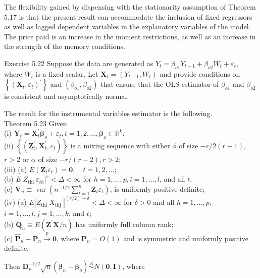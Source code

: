 \documentclass[10pt]{article}
\begin{document}
The flexibility gained by dispensing with the stationarity assumption of Theorem 5.17 is that the present result can accommodate the inclusion of fixed regressors as well as lagged dependent variables in the explanatory variables of the model. The price paid is an increase in the moment restrictions, as well as an increase in the strength of the memory conditions.

Exercise 5.22 Suppose the data are generated as $Y_{t}=\beta_{o 1} Y_{t-1}+\beta_{o 2} W_{t}+ \varepsilon_{t}$, where $W_{t}$ is a fixed scalar. Let $\mathbf{X}_{t}=\left(Y_{t-1}, W_{t}\right)$ and provide conditions on $\left\{\left(\mathbf{X}_{t}, \varepsilon_{t}\right)^{\prime}\right\}$ and $\left(\beta_{o 1}, \beta_{o 2}\right)$ that ensure that the OLS estimator of $\beta_{o 1}$ and $\beta_{o 2}$ is consistent and asymptotically normal.

The result for the instrumental variables estimator is the following.\\
Theorem 5.23 Given\\
(i) $\mathbf{Y}_{t}=\mathbf{X}_{t}^{\prime} \boldsymbol{\beta}_{o}+\varepsilon_{t}, t=1,2, \ldots, \boldsymbol{\beta}_{o} \in \mathbb{R}^{k}$;\\
(ii) $\left\{\left(\mathbf{Z}_{t}^{\prime}, \mathbf{X}_{t}^{\prime}, \varepsilon_{t}\right)\right\}$ is a mixing sequence with either $\phi$ of size $-r / 2(r-1)$, $r>2$ or $\alpha$ of size $-r /(r-2), r>2$;\\
(iii) (a) $E\left(\mathbf{Z}_{t} \varepsilon_{t}\right)=\mathbf{0}, \quad t=1,2, \ldots$;\\
(b) $E\left|Z_{\text {thi }} \varepsilon_{t h}\right|^{r}<\Delta<\infty$ for $h=1, \ldots, p, i=1, \ldots, l$, and all $t$;\\
(c) $\mathbf{V}_{n} \equiv \operatorname{var}\left(n^{-1 / 2} \sum_{t=1}^{n} \mathbf{Z}_{t} \varepsilon_{t}\right)$, is uniformly positive definite;\\
(iv) (a) $E\left|Z_{\text {thi }} X_{\text {thj }}\right|^{(r / 2)+\delta}<\Delta<\infty$ for $\delta>0$ and all $h=1, \ldots, p$, $i=1, \ldots, l, j=1, \ldots, k$, and $t$;\\
(b) $\mathbf{Q}_{n} \equiv E\left(\mathbf{Z}^{\prime} \mathbf{X} / n\right)$ has uniformly full column rank;\\
(c) $\hat{\mathbf{P}}_{n}-\mathbf{P}_{n} \xrightarrow{p} \mathbf{0}$, where $\mathbf{P}_{n}=O(1)$ and is symmetric and uniformly positive definite.

Then $\mathbf{D}_{n}^{-1 / 2} \sqrt{n}\left(\tilde{\boldsymbol{\beta}}_{n}-\boldsymbol{\beta}_{o}\right) \stackrel{A}{\sim} N(\mathbf{0}, \mathbf{I})$, where
\end{document}
